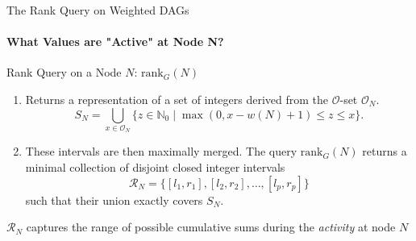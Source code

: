 \begin{frame}{The Rank Query on Weighted DAGs}
    \framesubtitle{What Values are "Active" at Node N?}
    \begin{block}{Rank Query on a Node $N$: $\mathrm{rank}_G(N)$}
        \begin{enumerate}
            \item Returns a representation of a set of integers derived from the $\mathcal{O}$-set $\mathcal{O}_N$.
                  \[ S_N = \bigcup_{x \in \mathcal{O}_N} \{ z \in \mathbb{N}_0 \mid \max(0, x - w(N) + 1) \le z \le x \}. \]
                  \vspace{-1em}
                  \pause
            \item These intervals are then maximally merged. The query $\mathrm{rank}_G(N)$ returns a \alert{minimal collection of disjoint closed integer intervals}
                  \[ \mathcal{R}_N = \{[l_1, r_1], [l_2, r_2], \dots, [l_p, r_p]\} \]
                  such that their union exactly covers $S_N$.
        \end{enumerate}
    \end{block}
    $\mathcal{R}_N$ captures the range of possible cumulative sums during the \emph{activity} at node $N$

\end{frame}

